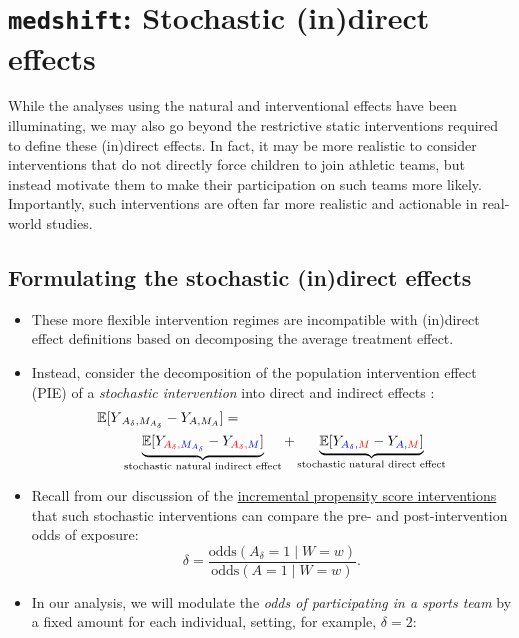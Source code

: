 \documentclass[
  12pt,
]{book}
\providecommand{\tightlist}{%
  \setlength{\itemsep}{0pt}\setlength{\parskip}{0pt}}
\theoremstyle{definition}
\theoremstyle{definition}
\theoremstyle{definition}
\newcommand{\E}{\mathbb{E}}
\newcommand{\1}{\mathbbm{1}}
\begin{document}
\hypertarget{medshift-stochastic-indirect-effects}{%
\section{\texorpdfstring{\texttt{medshift}: Stochastic (in)direct effects}{medshift: Stochastic (in)direct effects}}\label{medshift-stochastic-indirect-effects}}

While the analyses using the natural and interventional effects have been
illuminating, we may also go beyond the restrictive static interventions
required to define these (in)direct effects. In fact, it may be more realistic
to consider interventions that do not directly force children to join athletic
teams, but instead motivate them to make their participation on such teams more
likely. Importantly, such interventions are often far more realistic and
actionable in real-world studies.

\hypertarget{formulating-the-stochastic-indirect-effects}{%
\subsection{Formulating the stochastic (in)direct effects}\label{formulating-the-stochastic-indirect-effects}}

\begin{itemize}
\tightlist
\item
  These more flexible intervention regimes are incompatible with (in)direct
  effect definitions based on decomposing the average treatment effect.
\item
  Instead, consider the decomposition of the population intervention effect
  (PIE) of a \emph{stochastic intervention} into direct and indirect effects
  \citep{diaz2020causal}:
  \begin{align*}
  \E[Y&_{A_\delta,M_{A_\delta}} - Y_{A,M_A}] = \\
  &\underbrace{\E[Y_{\color{red}{A_\delta},\color{blue}{M_{A_\delta}}} -
    Y_{\color{red}{A_\delta},\color{blue}{M}}]}_{\text{stochastic natural indirect effect}} +
    \underbrace{\E[Y_{\color{blue}{A_\delta},\color{red}{M}} -
    Y_{\color{blue}{A},\color{red}{M}}]}_{\text{stochastic natural direct effect}}
  \end{align*}
\item
  Recall from our discussion of the \protect\hyperlink{ipsi}{incremental propensity score
  interventions} \citep{kennedy2018nonparametric} that such stochastic
  interventions can compare the pre- and post-intervention odds of exposure:
  \begin{equation*}
  \delta = \frac{\text{odds}(A_\delta = 1\mid W=w)}
  {\text{odds}(A = 1\mid W=w)}.
  \end{equation*}
\item
  In our analysis, we will modulate the \emph{odds of participating in a sports
  team} by a fixed amount for each individual, setting, for example,
  \(\delta = 2\):
\end{itemize}
\end{document}
